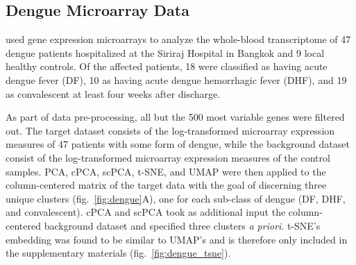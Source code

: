 \FloatBarrier

\subsection{Dengue Microarray Data}\label{dengue_data}

\citet{Kwissa2014} used gene expression microarrays to analyze the whole-blood transcriptome of 47 dengue patients hospitalized at the Siriraj Hospital in Bangkok and 9 local healthy controls. Of the affected patients, 18 were classified as having acute dengue fever (DF), 10 as having acute dengue hemorrhagic fever (DHF), and 19 as convalescent at least four weeks after discharge.

As part of data pre-processing, all but the 500 most variable genes were filtered out. The target dataset consists of the log-transformed microarray expression measures of 47 patients with some form of dengue, while the background dataset consist of the log-transformed microarray expression measures of the control samples. PCA, cPCA, scPCA, t-SNE, and UMAP were then applied to the column-centered matrix of the target data with the goal of discerning three unique clusters (fig.~\ref{fig:dengue}A), one for each sub-class of dengue (DF, DHF, and convalescent). cPCA and scPCA took as additional input the column-centered background dataset and specified three clusters \textit{a priori}. t-SNE's embedding was found to be similar to UMAP's and is therefore only included in the supplementary materials (fig.~\ref{fig:dengue_tsne}).
